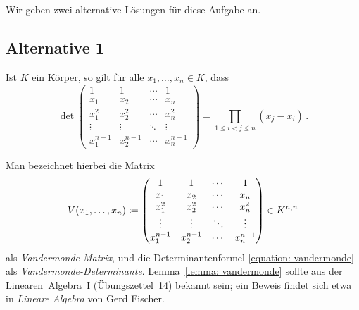 \section{}


Wir geben zwei alternative Lösungen für diese Aufgabe an.





\subsection*{Alternative 1}

\begin{lemma}
  \label{lemma: vandermonde}
  Ist $K$ ein Körper, so gilt für alle $x_1, \dotsc, x_n \in K$, dass
  \begin{equation}
  \label{equation: vandermonde}
      \det
      \begin{pmatrix}
        1         & 1         & \cdots  & 1         \\
        x_1       & x_2       & \cdots  & x_n       \\
        x_1^2     & x_2^2     & \cdots  & x_n^2     \\
        \vdots    & \vdots    & \ddots  & \vdots    \\
        x_1^{n-1} & x_2^{n-1} & \cdots  & x_n^{n-1}
      \end{pmatrix}
    = \prod_{1 \leq i < j \leq n} (x_j - x_i) \,.
  \end{equation}
\end{lemma}

Man bezeichnet hierbei die Matrix
\[
            V(x_1, \dotsc, x_n)
  \defined  \begin{pmatrix}
              1         & 1         & \cdots  & 1         \\
              x_1       & x_2       & \cdots  & x_n       \\
              x_1^2     & x_2^2     & \cdots  & x_n^2     \\
              \vdots    & \vdots    & \ddots  & \vdots    \\
              x_1^{n-1} & x_2^{n-1} & \cdots  & x_n^{n-1}
            \end{pmatrix}
  \in       \matrices{n}{K}
\]
als \emph{Vandermonde-Matrix}, und die Determinantenformel \eqref{equation: vandermonde} als \emph{Van\-der\-monde-De\-ter\-mi\-nan\-te}.
Lemma~\ref{lemma: vandermonde} sollte aus der Linearen~Algebra~I (Übungszettel~14) bekannt sein;
ein Beweis findet sich etwa in \emph{Lineare Algebra} von Gerd Fischer.


